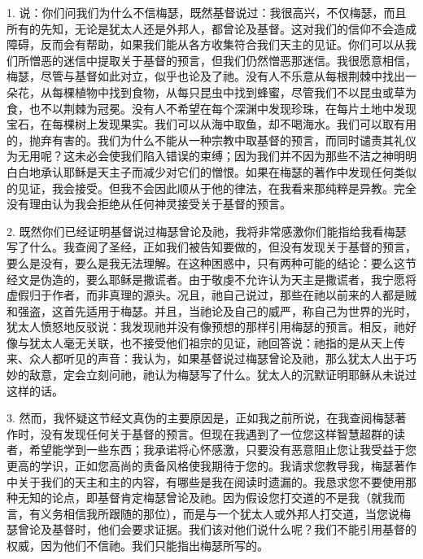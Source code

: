 1. 说：你们问我们为什么不信梅瑟，既然基督说过：我很高兴，不仅梅瑟，而且所有的先知，无论是犹太人还是外邦人，都曾论及基督。这对我们的信仰不会造成障碍，反而会有帮助，如果我们能从各方收集符合我们天主的见证。你们可以从我们所憎恶的迷信中提取关于基督的预言，但我们仍然憎恶那迷信。我很愿意相信，梅瑟，尽管与基督如此对立，似乎也论及了祂。没有人不乐意从每根荆棘中找出一朵花，从每棵植物中找到食物，从每只昆虫中找到蜂蜜，尽管我们不以昆虫或草为食，也不以荆棘为冠冕。没有人不希望在每个深渊中发现珍珠，在每片土地中发现宝石，在每棵树上发现果实。我们可以从海中取鱼，却不喝海水。我们可以取有用的，抛弃有害的。我们为什么不能从一种宗教中取基督的预言，而同时谴责其礼仪为无用呢？这未必会使我们陷入错误的束缚；因为我们并不因为那些不洁之神明明白白地承认耶稣是天主子而减少对它们的憎恨。如果在梅瑟的著作中发现任何类似的见证，我会接受。但我不会因此顺从于他的律法，在我看来那纯粹是异教。完全没有理由认为我会拒绝从任何神灵接受关于基督的预言。\par

2. 既然你们已经证明基督说过梅瑟曾论及祂，我将非常感激你们能指给我看梅瑟写了什么。我查阅了圣经，正如我们被告知要做的，但没有发现关于基督的预言，要么是没有，要么是我无法理解。在这种困惑中，只有两种可能的结论：要么这节经文是伪造的，要么耶稣是撒谎者。由于敬虔不允许认为天主是撒谎者，我宁愿将虚假归于作者，而非真理的源头。况且，祂自己说过，那些在祂以前来的人都是贼和强盗，这首先适用于梅瑟。并且，当祂论及自己的威严，称自己为世界的光时，犹太人愤怒地反驳说：我发现祂并没有像预想的那样引用梅瑟的预言。相反，祂好像与犹太人毫无关联，也不接受他们祖宗的见证，祂回答说：祂指的是从天上传来、众人都听见的声音：我认为，如果基督说过梅瑟曾论及祂，那么犹太人出于巧妙的敌意，定会立刻问祂，祂认为梅瑟写了什么。犹太人的沉默证明耶稣从未说过这样的话。\par

3. 然而，我怀疑这节经文真伪的主要原因是，正如我之前所说，在我查阅梅瑟著作时，没有发现任何关于基督的预言。但现在我遇到了一位您这样智慧超群的读者，希望能学到一些东西；我承诺将心怀感激，只要没有恶意阻止您让我受益于您更高的学识，正如您高尚的责备风格使我期待于您的。我请求您教导我，梅瑟著作中关于我们的天主和主的内容，有哪些是我在阅读时遗漏的。我恳求您不要使用那种无知的论点，即基督肯定梅瑟曾论及祂。因为假设您打交道的不是我（就我而言，有义务相信我所跟随的那位），而是与一个犹太人或外邦人打交道，当您说梅瑟曾论及基督时，他们会要求证据。我们该对他们说什么呢？我们不能引用基督的权威，因为他们不信祂。我们只能指出梅瑟所写的。\par

